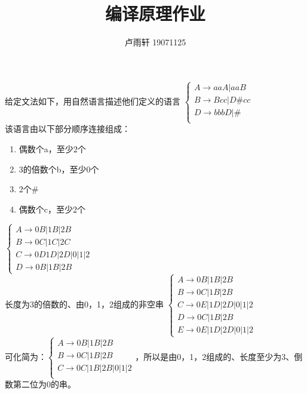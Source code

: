 \documentclass{ctexart}
\title{编译原理作业}
\author{卢雨轩 19071125}
\begin{document}
\maketitle

\begin{outline}
    \1[14.] 给定文法如下，用自然语言描述他们定义的语言
        \2[(1)] $\begin{cases}
            A \to aaA | aaB \\
            B \to Bcc | D\#cc \\
            D \to bbbD | \# \\
        \end{cases}$  \\
        该语言由以下部分顺序连接组成：
        \begin{enumerate}
            \item 偶数个a，至少2个
            \item 3的倍数个b，至少0个
            \item 2个\#
            \item 偶数个c，至少2个
        \end{enumerate}
        \2[(2)] $\begin{cases}
            A \to 0B | 1B | 2B \\
            B \to 0C | 1C | 2C \\
            C \to 0D  1D | 2D | 0 | 1 | 2 \\
            D \to 0B | 1B | 2B 
        \end{cases}$ \\
        长度为3的倍数的、由0，1，2组成的非空串
        \2[(3)] $\begin{cases}
            A \to 0B | 1B | 2B \\
            B \to 0C | 1B | 2B \\
            C \to 0E | 1D | 2D | 0 | 1 | 2 \\
            D \to 0C | 1B | 2B \\
            E \to 0E | 1D | 2D | 0 | 1 | 2
        \end{cases}$ \\
        可化简为：$\begin{cases}
            A \to 0B | 1B | 2B \\
            B \to 0C | 1B | 2B \\
            C \to 0C | 1B | 2B | 0 | 1 | 2 \\
        \end{cases}$，所以是由0，1，2组成的、长度至少为3、倒数第二位为0的串。

\end{outline}
\end{document}

